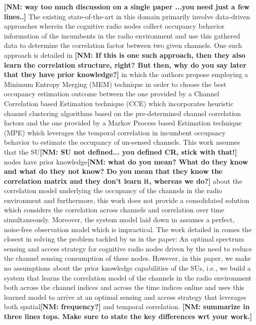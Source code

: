 \documentclass[10pt,twocolumn]{IEEEtran}
\newcommand{\nm}[1]{{\color{blue}\bf{[NM: #1]}}}
\begin{document}
 \nm{way too much discussion on a single paper \cite{6956794}...you need just a few lines..}
The existing state-of-the-art in this domain primarily involve data-driven approaches wherein the cognitive radio nodes collect occupancy behavior information of the incumbents in the radio environment and use this gathered data to determine the correlation factor between two given channels.
 One such approach is detailed in \cite{6956794}
 \nm{If this is one such approach, then they also learn the correlation structure, right? But then, why do you say later that they have prior knowledge?}
  in which the authors propose employing a Minimum Entropy Merging (MEM) technique in order to choose the best occupancy estimation outcome between the one provided by a Channel Correlation based Estimation technique (CCE) which incorporates heuristic channel clustering algorithms based on the pre-determined channel correlation factors and the one provided by a Markov Process based Estimation technique (MPE) which leverages the temporal correlation in incumbent occupancy behavior to estimate the occupancy of un-sensed channels. This work assumes that the SU\nm{SU not defined... you defined CR, stick with that!} nodes have prior knowledge\nm{what do you mean? What do they know and what do they not know? Do you mean that they know the correlation matrix and they don't learn it, whereas we do?} about the correlation model underlying the occupancy of the channels in the radio environment and furthermore, this work does not provide a consolidated solution which considers the correlation across channels and correlation over time simultaneously. Moreover, the system model laid down in \cite{6956794} assumes a perfect, noise-free observation model which is impractical. The work detailed in \cite{6956794} comes the closest in solving the problem tackled by us in the paper: An optimal spectrum sensing and access strategy for cognitive radio nodes driven by the need to reduce the channel sensing consumption of these nodes. However, in this paper, we make no assumptions about the prior knowledge capabilities of the SUs, i.e., we build a system that learns the correlation model of the channels in the radio environment both across the channel indices and across the time indices online and uses this learned model to arrive at an optimal sensing and access strategy that leverages both spatial\nm{frequency?} and temporal correlation.
  \nm{summarize \cite{6956794} in three lines tops. Make sure to state the key differences wrt your work.}
\end{document}
